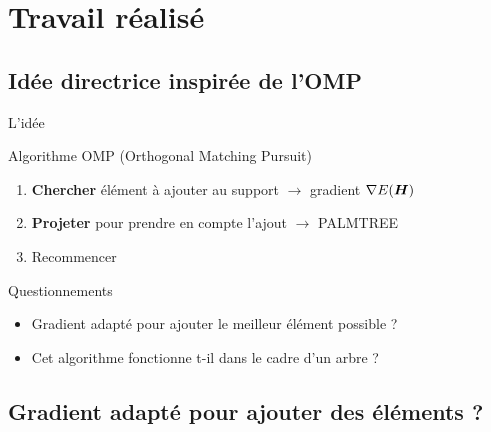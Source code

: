 \section{Travail réalisé}

\subsection{Idée directrice inspirée de l'OMP}
\begin{frame}{L'idée}
\begin{block}{Algorithme OMP (Orthogonal Matching Pursuit)}
	\begin{enumerate}
		\item \textbf{Chercher} élément à ajouter au support $\rightarrow$ \alert{gradient $\nabla E(\bm{H})$}
		\item \textbf{Projeter} pour prendre en compte l'ajout $\rightarrow$ \alert{PALMTREE}
		\item Recommencer
	\end{enumerate}
\end{block}
\begin{exampleblock}{Questionnements}
\begin{itemize}
	\item Gradient adapté pour ajouter le meilleur élément possible ?
	\item Cet algorithme fonctionne t-il dans le cadre d'un arbre ?
\end{itemize}
\end{exampleblock}
\end{frame}


\subsection{Gradient adapté pour ajouter des éléments ?}

